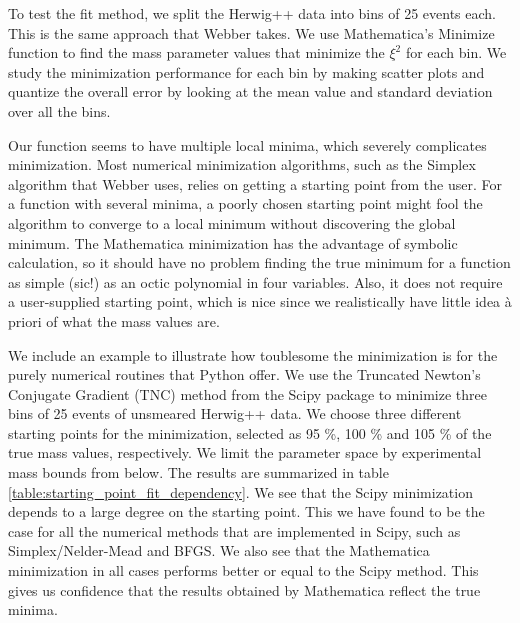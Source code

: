 \documentclass[twoside,english]{uiofysmaster}
\begin{document}
To test the fit method, we split the {\ttfamily Herwig++} data into bins of 25 events each. This is the same approach that Webber takes. We use Mathematica's {\ttfamily Minimize} function to find the mass parameter values that minimize the $\xi^2$ for each bin. We study the minimization performance for each bin by making scatter plots and quantize the overall error by looking at the mean value and standard deviation over all the bins.

Our function seems to have multiple local minima, which severely complicates minimization. Most numerical minimization algorithms, such as the Simplex algorithm that Webber uses, relies on getting a starting point from the user. For a function with several minima, a poorly chosen starting point might fool the algorithm to converge to a local minimum without discovering the global minimum. The Mathematica minimization has the advantage of symbolic calculation, so it should have no problem finding the true minimum for a function as simple (sic!) as an octic polynomial in four variables. Also, it does not require a user-supplied starting point, which is nice since we realistically have little idea \`{a} priori of what the mass values are.

We include an example to illustrate how toublesome the minimization is for the purely numerical routines that Python offer. We use the Truncated Newton's Conjugate Gradient (TNC) method from the Scipy \cite{SciPy} package to minimize three bins of 25 events of unsmeared {\ttfamily Herwig++} data. We choose three different starting points for the minimization, selected as 95 \%, 100 \% and 105 \% of the true mass values, respectively. We limit the parameter space by experimental mass bounds from below. The results are summarized in table \ref{table:starting_point_fit_dependency}. We see that the Scipy minimization depends to a large degree on the starting point. This we have found to be the case for all the numerical methods that are implemented in Scipy, such as Simplex/Nelder-Mead and BFGS. We also see that the Mathematica minimization in all cases performs better or equal to the Scipy method. This gives us confidence that the results obtained by Mathematica reflect the true minima. 
\end{document}
